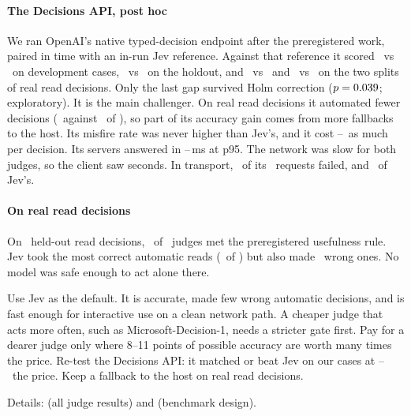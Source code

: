 \paragraph{The Decisions API, post hoc} We ran OpenAI's native typed-decision endpoint after the preregistered work,
paired in time with an in-run Jev reference. Against that reference it scored \OaDevLunaK\ vs \OaDevJevK\ on
development cases, \OaHoldoutLunaK\ vs \OaHoldoutJevK\ on the holdout, and \OaTraceDevLunaK\ vs \OaTraceDevJevK\ and
\OaTraceHoldoutLunaK\ vs \OaTraceHoldoutJevK\ on the two splits of real read decisions. Only the last gap survived Holm
correction ($p = 0.039$; exploratory). It is the main challenger. On real read decisions it automated fewer decisions (\OaTrHoldLunaCovK\ against
\OaTrHoldJevCovK\ of \OaTrHoldN), so part of its accuracy gain comes from more fallbacks to the host. Its misfire rate was never
higher than Jev's, and it cost \OaPriceXLo--\OaPriceXHi\X\ as much per decision. Its servers answered in
\OaServerPninetyfiveLo--\OaServerPninetyfiveHi\,ms at p95. The network was slow for both judges, so the client saw
seconds. In transport, \OaInvalid\ of its \OaRequests\ requests failed, and \OaInvalidJev\ of Jev's.

\paragraph{On real read decisions} On \TrN\ held-out read decisions, \TrNUseful\ of \NumBase\ judges met the
preregistered usefulness rule. Jev took the most correct automatic reads (\TrJevReads\ of \TrReadCases) but also made
\TrJevWaK\ wrong ones. No model was safe enough to act alone there.

\begin{keyidea}[title={For practitioners}]
Use Jev as the default. It is accurate, made few wrong automatic decisions, and is fast enough for interactive use on a
clean network path. A cheaper judge that acts more often, such as Microsoft-Decision-1, needs a stricter gate first. Pay for a dearer judge only where 8--11 points of possible accuracy are worth many times the price. Re-test the
Decisions API: it matched or beat Jev on our cases at \OaPriceXLo--\OaPriceXHi\X\ the price. Keep a fallback to the
host on real read decisions.
\end{keyidea}

Details:  (all judge results) and  (benchmark design).
